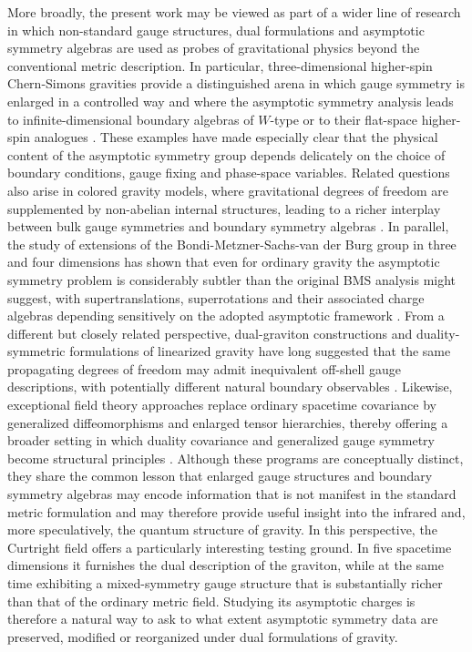 \documentclass[a4paper,12pt]{article}
\begin{document}
More broadly, the present work may be viewed as part of a wider line of research in which non-standard gauge structures, dual formulations and asymptotic symmetry algebras are used as probes of gravitational physics beyond the conventional metric description. In particular, three-dimensional higher-spin Chern-Simons gravities provide a distinguished arena in which gauge symmetry is enlarged in a controlled way and where the asymptotic symmetry analysis leads to infinite-dimensional boundary algebras of $W$-type or to their flat-space higher-spin analogues \cite{Campoleoni:2010zq,Henneaux:2010xg,Campoleoni:2011hg,Gonzalez:2013oaa}. These examples have made especially clear that the physical content of the asymptotic symmetry group depends delicately on the choice of boundary conditions, gauge fixing and phase-space variables. Related questions also arise in colored gravity models, where gravitational degrees of freedom are supplemented by non-abelian internal structures, leading to a richer interplay between bulk gauge symmetries and boundary symmetry algebras \cite{Joung:2017hsi,Monjo:2025u13}. In parallel, the study of extensions of the Bondi-Metzner-Sachs-van der Burg group in three and four dimensions has shown that even for ordinary gravity the asymptotic symmetry problem is considerably subtler than the original BMS analysis might suggest, with supertranslations, superrotations and their associated charge algebras depending sensitively on the adopted asymptotic framework \cite{Barnich:2010ojg,Barnich:2011ChargeAlgebra, Barnich:2010BMSsuperrotations,Barnich:2014kra,Freidel_2021weyl,Campiglia_2020}. From a different but closely related perspective, dual-graviton constructions and duality-symmetric formulations of linearized gravity have long suggested that the same propagating degrees of freedom may admit inequivalent off-shell gauge descriptions, with potentially different natural boundary observables \cite{Bunster:2013oaa,Hull:2001iu,Hull:2023iny,Hull:2024qpy}. Likewise, exceptional field theory approaches replace ordinary spacetime covariance by generalized diffeomorphisms and enlarged tensor hierarchies, thereby offering a broader setting in which duality covariance and generalized gauge symmetry become structural principles \cite{Hohm:2013pua,Hohm:2013vpa,Hohm:2013uia,Hohm:2014fxa,West:2014xma}. Although these programs are conceptually distinct, they share the common lesson that enlarged gauge structures and boundary symmetry algebras may encode information that is not manifest in the standard metric formulation and may therefore provide useful insight into the infrared and, more speculatively, the quantum structure of gravity. In this perspective, the Curtright field offers a particularly interesting testing ground. In five spacetime dimensions it furnishes the dual description of the graviton, while at the same time exhibiting a mixed-symmetry gauge structure that is substantially richer than that of the ordinary metric field. Studying its asymptotic charges is therefore a natural way to ask to what extent asymptotic symmetry data are preserved, modified or reorganized under dual formulations of gravity.
\end{document}
